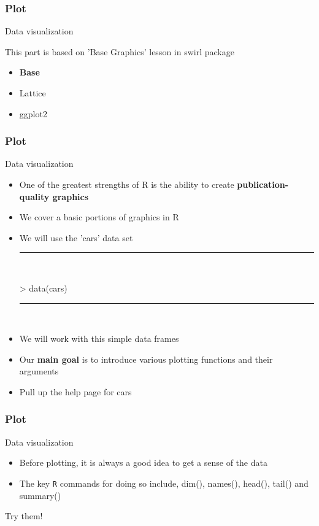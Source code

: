 \documentclass{beamer}
\begin{document}
\begin{frame}[fragile]
	\frametitle{Plot}
	\centering \Large Data visualization
	
	\centering \footnotesize This part is based on 'Base Graphics' lesson in swirl package
	\begin{itemize}
		\small
		\item \textbf{Base}
		\item Lattice
		\item ggplot2
	\end{itemize}
\end{frame}


\begin{frame}[fragile]
	\frametitle{Plot}
	\centering \Large Data visualization
	\begin{itemize}
		\small
	\item One of the greatest strengths of R is the ability to create \textbf{publication-quality graphics}
		\item We cover a basic portions of graphics in R
		\item We will use the 'cars' data set
\rule{\textwidth}{0.4pt}\\
\tiny
\setlength{\fancyvrbtopsep}{-1pt}
\setlength{\fancyvrbpartopsep}{-1pt}
\begin{Schunk}
\begin{Sinput}
> data(cars)
\end{Sinput}
\end{Schunk}
\rule{\textwidth}{0.4pt}\\
\small
		\item We will work with this simple data frames
		\item Our \textbf{main goal} is to introduce various plotting functions and their arguments
		\item Pull up the help page for cars
	\end{itemize}
\end{frame}

\begin{frame}[fragile]
	\frametitle{Plot}
	\centering \Large Data visualization
	\begin{itemize}
		\small
		\item Before plotting, it is always a good idea to get a sense of the data 
		\item The key \texttt{R} commands for doing so include, dim(), names(), head(), tail() and summary()
	\end{itemize}

	\begin{center} \normalsize Try them! \end{center}
\end{frame}
\end{document}
